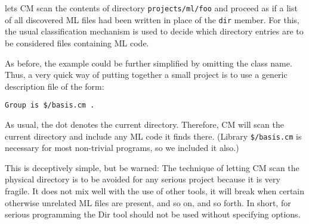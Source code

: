 lets CM scan the contents of directory {\tt projects/ml/foo} and
proceed as if a list of all discovered ML files had been written
in place of the {\tt dir} member.  For this, the usual classification
mechanism is used to decide which directory entries are to be
considered files containing ML code.

As before, the example could be further simplified by omitting the
class name.  Thus, a very quick way of putting together a small
project is to use a generic description file of the form:

\begin{lstlisting}[language=CM]
Group is $/basis.cm .
\end{lstlisting}%

As usual, the dot denotes the current directory.  Therefore, CM will
scan the current directory and include any ML code it finds there.
(Library {\tt \$/basis.cm} is necessary for most non-trivial programs,
so we included it also.)

This is deceptively simple, but be warned: The technique of letting CM
scan the physical directory is to be avoided for any serious project
because it is very fragile.  It does not mix well with the use of
other tools, it will break when certain otherwise unrelated ML files
are present, and so on, and so forth. In short, for serious
programming the Dir tool should not be used without specifying
options.
